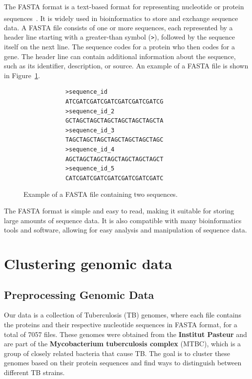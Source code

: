 The FASTA format is a text-based format for representing nucleotide or protein
sequences~\textsuperscript{\cite{fasta-format-genbank,wikipedia-fasta-format-2025}}. It is widely used in bioinformatics
to store and exchange sequence data. A FASTA file consists of one or more sequences, each represented by a header line starting with
a greater-than symbol (\texttt{>}), followed by the sequence itself on the next line. The sequence codes for a protein who then codes for a
gene. The header line can contain additional information about the sequence, such as its identifier, description, or source. An example of a
FASTA file is shown in Figure~\ref{fig:fasta_example}.

\begin{center}
	\begin{figure}[H]
		\begin{BVerbatim}
			>sequence_id
			ATCGATCGATCGATCGATCGATCGATCG
			>sequence_id_2
			GCTAGCTAGCTAGCTAGCTAGCTAGCTA
			>sequence_id_3
			TAGCTAGCTAGCTAGCTAGCTAGCTAGC
			>sequence_id_4
			AGCTAGCTAGCTAGCTAGCTAGCTAGCT
			>sequence_id_5
			CATCGATCGATCGATCGATCGATCGATC
		\end{BVerbatim}
		\caption{Example of a FASTA file containing two sequences.}
		\label{fig:fasta_example}
	\end{figure}
\end{center}

The FASTA format is simple and easy to read, making it suitable for storing large amounts of sequence data. It is also compatible
with many bioinformatics tools and software, allowing for easy analysis and manipulation of sequence data.

\chapter{Clustering genomic data}
\label{chap:clustering_genomic_data}

\section{Preprocessing Genomic Data}
\label{sec:preprocessing_genomic_data}

Our data is a collection of Tuberculosis (TB) genomes, where each file contains the proteins and their respective nucleotide sequences
in FASTA format, for a total of 7057 files. These genomes were obtained from the \textbf{Institut Pasteur} and are part of the
\textbf{Mycobacterium tuberculosis complex} (MTBC), which is a group of closely related bacteria that cause TB. The goal is to cluster
these genomes based on their protein sequences and find ways to distinguish between different TB strains.

